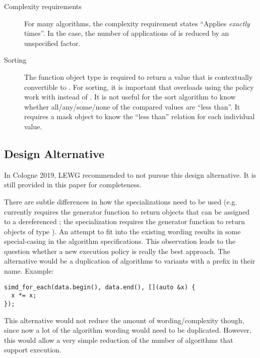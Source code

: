 \begin{description}
  \item[Complexity requirements]
    For many algorithms, the complexity requirement states “Applies  \emph{exactly}  times”.
    In the \simdEP case, the number of applications of  is reduced by an unspecified factor.

  \item[Sorting]
    The  function object type is required to return a value that is contextually convertible to \bool.
    For sorting, it is important that overloads using the \simdEP policy work with  instead of \bool.
    It is not useful for the sort algorithm to know whether all/any/some/none of the compared values are “less than”.
    It requires a mask object to know the “less than” relation for each individual value.
\end{description}

\subsection{Design Alternative}
In Cologne 2019, LEWG recommended to not pursue this design alternative.
It is still provided in this paper for completeness.

There are subtle differences in how the \simdEP specializations need to be used
(e.g.  currently requires the generator function to return objects that can be assigned to a dereferenced ;
the \simdEP specialization requires the generator function to return objects of type ).
An attempt to fit \simdEPT into the existing wording results in some special-casing in the algorithm specifications.
This observation leads to the question whether a new execution policy is really the best approach.
The alternative would be a duplication of algorithms to variants with a  prefix in their name.
Example:
\smallskip\begin{lstlisting}[style=Vc]
simd_for_each(data.begin(), data.end(), [](auto &x) {
  x *= x;
});
\end{lstlisting}

This alternative would not reduce the amount of wording/complexity though, since now a lot of the algorithm wording would need to be duplicated.
However, this would allow a very simple reduction of the number of algorithms that support \simd execution.

